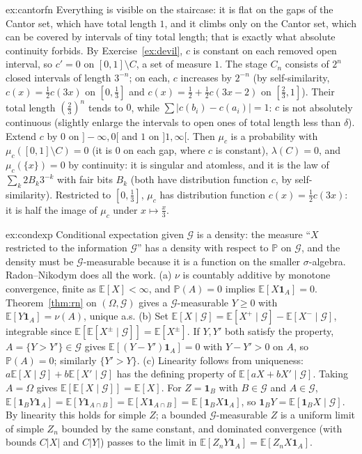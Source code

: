 \begin{solution}{ex:cantorfn}
\idea Everything is visible on the staircase: it is flat on the gaps of the Cantor set, which have total length $1$, and it climbs only on the Cantor set, which can be covered by intervals of tiny total
length; that is exactly what absolute continuity forbids.
\writeup By Exercise~\ref{ex:devil}, $c$ is constant on each removed open interval, so $c'=0$ on $[0,1]\setminus C$, a set of measure $1$. The stage $C_n$ consists of $2^n$ closed intervals of length $3^{-n}$; on each,
$c$ increases by $2^{-n}$ (by self-similarity, $c(x)=\frac12c(3x)$ on $[0,\frac13]$ and $c(x)=\frac12+\frac12c(3x-2)$ on $[\frac23,1]$). Their total length $(\frac23)^n$ tends to $0$, while $\sum|c(b_i)-c(a_i)|=1$: $c$ is not absolutely
continuous (slightly enlarge the intervals to open ones of total length less than $\delta$). Extend $c$ by $0$ on $]-\infty,0[$ and $1$ on $]1,\infty[$. Then $\mu_c$ is a probability with $\mu_c([0,1]\setminus C)=0$ (it is $0$
on each gap, where $c$ is constant), $\lambda(C)=0$, and $\mu_c(\{x\})=0$ by continuity: it is singular and atomless, and it is the law of $\sum_k2B_k3^{-k}$ with fair bits $B_k$ (both have distribution function $c$,
by self-similarity). Restricted to $[0,\frac13]$, $\mu_c$ has distribution function $c(x)=\frac12c(3x)$: it is half the image of $\mu_c$ under $x\mapsto\frac x3$.
\end{solution}

\begin{solution}{ex:condexp}
\idea Conditional expectation given $\mathcal G$ is a density: the measure ``$X$ restricted to the information $\mathcal G$'' has a density with respect to $\mathbb P$ on $\mathcal G$, and the density must be
$\mathcal G$-measurable because it is a function on the smaller $\sigma$-algebra. Radon--Nikodym does all the work.
\writeup (a) $\nu$ is countably additive by monotone convergence, finite as $\mathbb E[X]<\infty$, and $\mathbb P(A)=0$ implies $\mathbb E[X\mathbf 1_A]=0$. Theorem~\ref{thm:rn} on $(\Omega,\mathcal G)$ gives a $\mathcal G$-measurable $Y\ge0$ with
$\mathbb E[Y\mathbf 1_A]=\nu(A)$, unique a.s. (b) Set $\mathbb E[X\mid\mathcal G]=\mathbb E[X^+\mid\mathcal G]-\mathbb E[X^-\mid\mathcal G]$, integrable since $\mathbb E[\mathbb E[X^\pm\mid\mathcal G]]=\mathbb E[X^\pm]$. If $Y,Y'$ both satisfy the property,
$A=\{Y>Y'\}\in\mathcal G$ gives $\mathbb E[(Y-Y')\mathbf 1_A]=0$ with $Y-Y'>0$ on $A$, so $\mathbb P(A)=0$; similarly $\{Y'>Y\}$. (c) Linearity follows from uniqueness: $a\mathbb E[X\mid\mathcal G]+b\mathbb E[X'\mid\mathcal G]$ has the defining
property of $\mathbb E[aX+bX'\mid\mathcal G]$. Taking $A=\Omega$ gives $\mathbb E[\mathbb E[X\mid\mathcal G]]=\mathbb E[X]$. For $Z=\mathbf 1_B$ with $B\in\mathcal G$ and $A\in\mathcal G$, $\mathbb E[\mathbf 1_BY\mathbf 1_A]=\mathbb E[Y\mathbf 1_{A\cap B}]=\mathbb E[X\mathbf 1_{A\cap B}]=\mathbb E[\mathbf 1_BX\mathbf 1_A]$,
so $\mathbf 1_BY=\mathbb E[\mathbf 1_BX\mid\mathcal G]$. By linearity this holds for simple $Z$; a bounded $\mathcal G$-measurable $Z$ is a uniform limit of simple $Z_n$ bounded by the same constant, and dominated convergence (with
bounds $C|X|$ and $C|Y|$) passes to the limit in $\mathbb E[Z_nY\mathbf 1_A]=\mathbb E[Z_nX\mathbf 1_A]$.
\end{solution}


